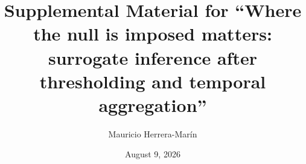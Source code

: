 \documentclass[aps,pre,preprint,amsmath,amssymb,longbibliography,superscriptaddress]{revtex4-2}
\begin{document}
\title{Supplemental Material for ``Where the null is imposed matters: surrogate inference after thresholding and temporal aggregation''}
\author{Mauricio Herrera-Mar\'in}
\date{August 9, 2026}
\maketitle

\end{document}
